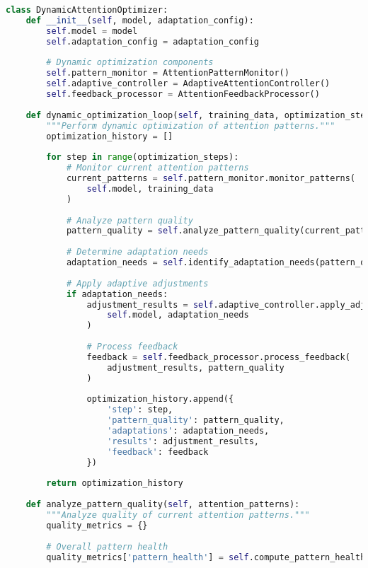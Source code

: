 \begin{lstlisting}[language=Python, caption=Attention pattern analysis and optimization framework]
class DynamicAttentionOptimizer:
    def __init__(self, model, adaptation_config):
        self.model = model
        self.adaptation_config = adaptation_config
        
        # Dynamic optimization components
        self.pattern_monitor = AttentionPatternMonitor()
        self.adaptive_controller = AdaptiveAttentionController()
        self.feedback_processor = AttentionFeedbackProcessor()
        
    def dynamic_optimization_loop(self, training_data, optimization_steps):
        """Perform dynamic optimization of attention patterns."""
        optimization_history = []
        
        for step in range(optimization_steps):
            # Monitor current attention patterns
            current_patterns = self.pattern_monitor.monitor_patterns(
                self.model, training_data
            )
            
            # Analyze pattern quality
            pattern_quality = self.analyze_pattern_quality(current_patterns)
            
            # Determine adaptation needs
            adaptation_needs = self.identify_adaptation_needs(pattern_quality)
            
            # Apply adaptive adjustments
            if adaptation_needs:
                adjustment_results = self.adaptive_controller.apply_adjustments(
                    self.model, adaptation_needs
                )
                
                # Process feedback
                feedback = self.feedback_processor.process_feedback(
                    adjustment_results, pattern_quality
                )
                
                optimization_history.append({
                    'step': step,
                    'pattern_quality': pattern_quality,
                    'adaptations': adaptation_needs,
                    'results': adjustment_results,
                    'feedback': feedback
                })
        
        return optimization_history
    
    def analyze_pattern_quality(self, attention_patterns):
        """Analyze quality of current attention patterns."""
        quality_metrics = {}
        
        # Overall pattern health
        quality_metrics['pattern_health'] = self.compute_pattern_health(attention_patterns)
        

\end{lstlisting}
